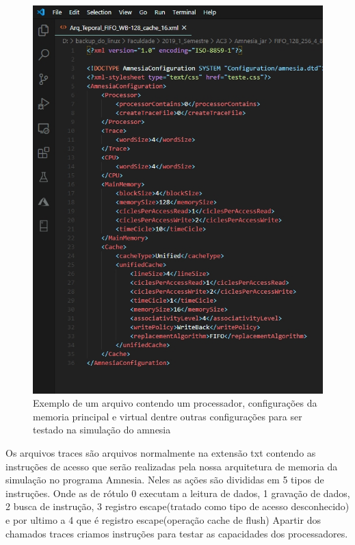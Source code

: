 \documentclass[conference]{IEEEtran}
\begin{document}
\begin{itemize}
\begin{figure}[H]
  \includegraphics[width=\linewidth]{arquitetura_de_memoria.jpg}
  \caption{Exemplo de um arquivo contendo um processador, configurações da memoria principal e virtual dentre outras configurações para ser testado na simulação do amnesia}
  \label{fig:Tela do Programa Amnesia fazendo um teste}
\end{figure}

Os arquivos traces são  arquivos normalmente na extensão txt contendo as instruções de acesso que serão realizadas pela nossa arquitetura de memoria da simulação no programa Amnesia. Neles as ações são divididas em 5 tipos de instruções. Onde as de rótulo 0 executam a leitura de dados, 1 gravação de dados, 2 busca de instrução, 3 registro escape(tratado como tipo de acesso desconhecido) e por ultimo a 4 que é registro escape(operação cache de flush)
Apartir dos chamados traces criamos instruções para testar as capacidades dos processadores.
\

\end{itemize}
\end{document}
